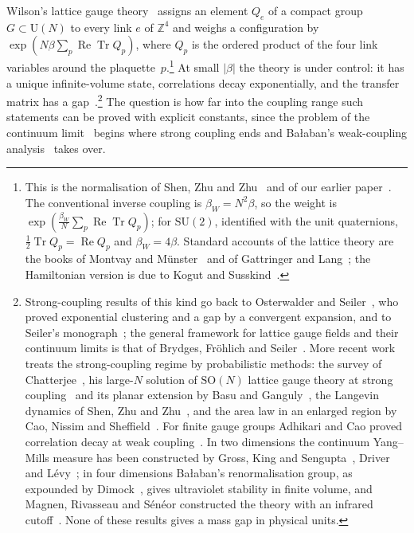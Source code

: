 \documentclass[aps,prd,twocolumn,superscriptaddress,nofootinbib,longbibliography,floatfix,amsmath,amssymb,10pt]{revtex4-2}
\theoremstyle{definition}
\theoremstyle{remark}
\newcommand{\Z}{\mathbb{Z}}
\newcommand{\SU}{\mathrm{SU}}
\newcommand{\SO}{\mathrm{SO}}
\newcommand{\U}{\mathrm{U}}
\newcommand{\Tr}{\operatorname{Tr}}
\newcommand{\ReTr}{\operatorname{Re}\operatorname{Tr}}
\begin{document}
Wilson's lattice gauge theory~\cite{Wil74} assigns an element $Q_e$ of a
compact group $G\subset\U(N)$ to every link $e$ of $\Z^4$ and weighs a
configuration by $\exp(N\beta\sum_p\ReTr Q_p)$, where $Q_p$ is the ordered
product of the four link variables around the plaquette~$p$.\footnote{This is
the normalisation of Shen, Zhu and Zhu~\cite{SZZ23} and of our earlier
paper~\cite{BB26a}. The conventional inverse coupling is $\beta_W=N^2\beta$,
so the weight is $\exp(\frac{\beta_W}N\sum_p\ReTr Q_p)$; for $\SU(2)$,
identified with the unit quaternions, $\frac12\Tr Q_p=\operatorname{Re}Q_p$
and $\beta_W=4\beta$. Standard accounts of the lattice theory are the books
of Montvay and M\"unster~\cite{MM94} and of Gattringer and
Lang~\cite{GL10}; the Hamiltonian version is due to Kogut and
Susskind~\cite{KS75}.} At small $|\beta|$ the theory is under control: it has
a unique infinite-volume state, correlations decay exponentially, and the
transfer matrix has a gap~\cite{OSei78,Sei82}.\footnote{Strong-coupling results of this kind go back to
Osterwalder and Seiler~\cite{OSei78}, who proved exponential clustering and
a gap by a convergent expansion, and to Seiler's monograph~\cite{Sei82}; the
general framework for lattice gauge fields and their continuum limits is
that of Brydges, Fr\"ohlich and Seiler~\cite{BFS79}. More recent work treats
the strong-coupling regime by probabilistic methods: the survey of
Chatterjee~\cite{Chat19}, his large-$N$ solution of $\SO(N)$ lattice gauge
theory at strong coupling~\cite{Chat19b} and its planar extension by Basu
and Ganguly~\cite{BG18}, the Langevin dynamics of Shen, Zhu and
Zhu~\cite{SZZ23}, and the area law in an enlarged region by Cao, Nissim and
Sheffield~\cite{CNS25}. For finite gauge groups Adhikari and Cao proved
correlation decay at weak coupling~\cite{AC25}. In two dimensions the
continuum Yang--Mills measure has been constructed by Gross, King and
Sengupta~\cite{GKS89}, Driver~\cite{Dri89} and L\'evy~\cite{Lev03}; in four
dimensions Ba{\l}aban's renormalisation group, as expounded by
Dimock~\cite{Dim13}, gives ultraviolet stability in finite volume, and
Magnen, Rivasseau and S\'en\'eor constructed the theory with an infrared
cutoff~\cite{MRS93}. None of these results gives a mass gap in physical
units.} The question is how far into
the coupling range such statements can be proved with explicit constants,
since the problem of the continuum limit~\cite{JW06} begins where strong
coupling ends and Ba{\l}aban's weak-coupling
analysis~\cite{Bal84a,Bal85a,Bal89b} takes over.
\end{document}
